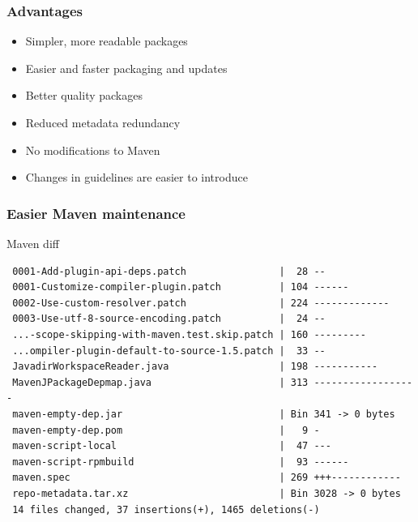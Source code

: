 \documentclass[pdftex,unicode,xcolor=table]{beamer}
\begin{document}
\begin{frame}
  \frametitle{Advantages}
  \begin{itemize}
    \item Simpler, more readable packages
    \item Easier and faster packaging and updates
    \item Better quality packages
    \item Reduced metadata redundancy
    \item No modifications to Maven
    \item Changes in guidelines are easier to introduce
  \end{itemize}
\end{frame}

\begin{frame}[fragile]
  \frametitle{Easier Maven maintenance}
  \begin{block}{Maven diff}
    \scriptsize
\begin{verbatim}
 0001-Add-plugin-api-deps.patch                |  28 --
 0001-Customize-compiler-plugin.patch          | 104 ------
 0002-Use-custom-resolver.patch                | 224 -------------
 0003-Use-utf-8-source-encoding.patch          |  24 --
 ...-scope-skipping-with-maven.test.skip.patch | 160 ---------
 ...ompiler-plugin-default-to-source-1.5.patch |  33 --
 JavadirWorkspaceReader.java                   | 198 -----------
 MavenJPackageDepmap.java                      | 313 ------------------
 maven-empty-dep.jar                           | Bin 341 -> 0 bytes
 maven-empty-dep.pom                           |   9 -
 maven-script-local                            |  47 ---
 maven-script-rpmbuild                         |  93 ------
 maven.spec                                    | 269 +++------------
 repo-metadata.tar.xz                          | Bin 3028 -> 0 bytes
 14 files changed, 37 insertions(+), 1465 deletions(-)
\end{verbatim}
  \end{block}
\end{frame}
\end{document}
